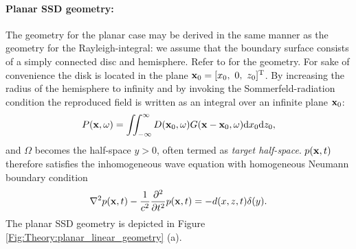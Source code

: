 \paragraph{Planar SSD geometry:}
The geometry for the planar case may be derived in the same manner as the geometry for the Rayleigh-integral: we assume that the boundary surface consists of a simply connected disc and hemisphere. Refer to \cite[p.~84,p.~275]{Ahrens2012, Williams1999} for the geometry. For sake of convenience the disk is located in the plane $\mathbf{x}_0 = [x_0,\ 0,\ z_0]^{\mathrm{T}}$. By increasing the radius of the hemisphere to infinity and by invoking the Sommerfeld-radiation condition the reproduced field is written as an integral over an infinite plane $\mathbf{x}_0$:
\begin{equation}
P(\mathbf{x},\omega) = \iint_{-\infty}^{\infty} D(\mathbf{x}_0,\omega) G(\mathbf{x} - \mathbf{x}_0 , \omega ) \mathrm{d} x_0 \mathrm{d} z_0,
\label{Eq:Theory:3D_planar_SFS}
\end{equation}
and $\Omega$ becomes the half-space $y>0$, often termed as \emph{target half-space}.
$p(\mathbf{x},t)$ therefore satisfies the inhomogeneous wave equation with homogeneous Neumann boundary condition
\begin{equation}
\nabla^2 p(\mathbf{x},t) - \frac{1}{c^2}\frac{\partial^2}{\partial t^2} p(\mathbf{x},t) = - d(x,z,t)\delta(y).
\label{Eq:Theory:3D_planar_SFS_time}
\end{equation}
The planar SSD geometry is depicted in Figure \ref{Fig:Theory:planar_linear_geometry} (a).


